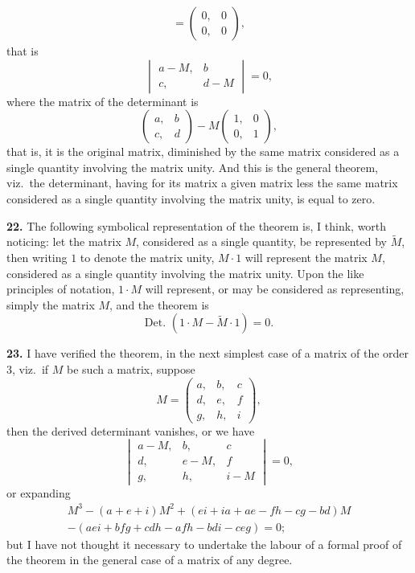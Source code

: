 \documentclass[11pt,a4paper]{book}
\begin{document}
\begin{center}
\begin{multline*}
= \begin{pmatrix} 0, & 0 \\ 0, & 0 \end{pmatrix},
\end{multline*}
that is
\[
\begin{vmatrix} a-M, & b \\ c, & d-M \end{vmatrix} = 0,
\]
where the matrix of the determinant is
\[
\begin{pmatrix} a, & b \\ c, & d \end{pmatrix} - M\begin{pmatrix} 1, & 0 \\ 0, & 1 \end{pmatrix},
\]
that is, it is the original matrix, diminished by the same matrix considered as a single quantity involving the matrix unity. And this is the general theorem, viz.\ the determinant, having for its matrix a given matrix less the same matrix considered as a single quantity involving the matrix unity, is equal to zero.

\medskip
\noindent\textbf{22.} The following symbolical representation of the theorem is, I think, worth noticing: let the matrix $M$, considered as a single quantity, be represented by $\tilde{M}$, then writing $1$ to denote the matrix unity, $M \cdot 1$ will represent the matrix $M$, considered as a single quantity involving the matrix unity. Upon the like principles of notation, $1 \cdot M$ will represent, or may be considered as representing, simply the matrix $M$, and the theorem is
\[\text{Det. }(1 \cdot M - \tilde{M} \cdot 1) = 0.\]

\medskip
\noindent\textbf{23.} I have verified the theorem, in the next simplest case of a matrix of the order 3, viz.\ if $M$ be such a matrix, suppose
\[
M = \begin{pmatrix} a, & b, & c \\ d, & e, & f \\ g, & h, & i \end{pmatrix},
\]
then the derived determinant vanishes, or we have
\[
\begin{vmatrix}
a-M, & b, & c \\
d, & e-M, & f \\
g, & h, & i-M
\end{vmatrix} = 0,
\]
or expanding
\begin{multline*}
M^3 - (a+e+i)M^2 + (ei+ia+ae-fh-cg-bd)M \\
- (aei+bfg+cdh-afh-bdi-ceg) = 0;
\end{multline*}
but I have not thought it necessary to undertake the labour of a formal proof of the theorem in the general case of a matrix of any degree.


\end{center}
\end{document}
